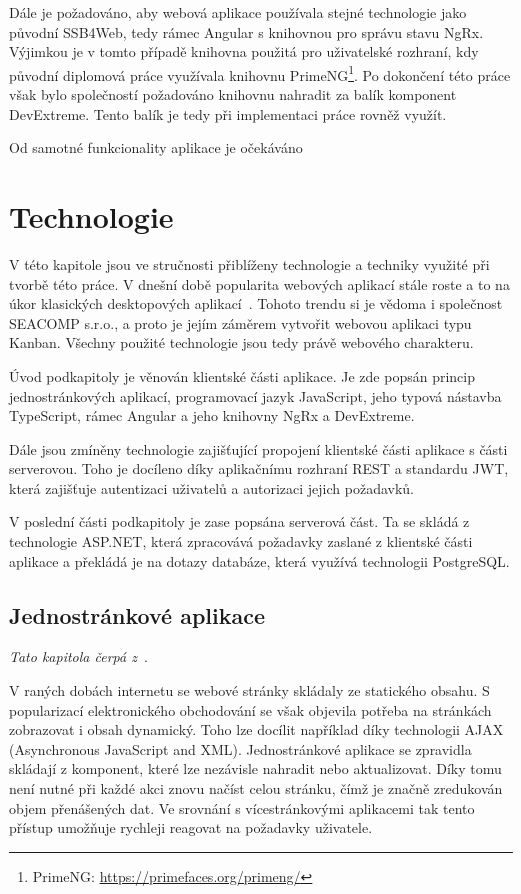 Dále je požadováno, aby webová aplikace používala stejné technologie jako původní SSB4Web, tedy rámec Angular s knihovnou pro správu stavu NgRx. Výjimkou je v tomto případě knihovna použitá pro uživatelské rozhraní, kdy původní diplomová práce využívala knihovnu PrimeNG\footnote{PrimeNG: \url{https://primefaces.org/primeng/}}. Po dokončení této práce však bylo společností požadováno knihovnu nahradit za balík komponent DevExtreme. Tento balík je tedy při implementaci práce rovněž využít.

Od samotné funkcionality aplikace je očekáváno \blindtext




\chapter{Technologie}
V této kapitole jsou ve stručnosti přiblíženy technologie a techniky využité při tvorbě této práce. 
V dnešní době popularita webových aplikací stále roste a to na úkor klasických desktopových aplikací~\cite{bib:web-apps-popular}. Tohoto trendu si je vědoma i společnost SEACOMP s.r.o., a proto je jejím záměrem vytvořit webovou aplikaci typu Kanban. Všechny použité technologie jsou tedy právě webového charakteru.

Úvod podkapitoly je věnován klientské části aplikace. Je zde popsán princip jednostránkových aplikací, programovací jazyk JavaScript, jeho typová nástavba TypeScript, rámec Angular a jeho knihovny NgRx a DevExtreme.

Dále jsou zmíněny technologie zajišťující propojení klientské části aplikace s části serverovou. Toho je docíleno díky aplikačnímu rozhraní REST a standardu JWT, která zajišťuje autentizaci uživatelů a autorizaci jejich požadavků.

V poslední části podkapitoly je zase popsána serverová část. Ta se skládá z technologie ASP.NET, která zpracovává požadavky zaslané z klientské části aplikace a překládá je na dotazy databáze, která využívá technologii PostgreSQL.


\section{Jednostránkové aplikace}\label{sec:spa}

\emph{Tato kapitola čerpá z~\cite{bib:spa}}.

V raných dobách internetu se webové stránky skládaly ze statického obsahu. S popularizací elektronického obchodování se však objevila potřeba na stránkách zobrazovat i obsah dynamický. 
Toho lze docílit například díky technologii AJAX (Asynchronous JavaScript and XML). Jednostránkové aplikace se zpravidla skládají z komponent, které lze nezávisle nahradit nebo aktualizovat. Díky tomu není nutné při každé akci znovu načíst celou stránku, čímž je značně zredukován objem přenášených dat. Ve srovnání s vícestránkovými aplikacemi tak tento přístup umožňuje rychleji reagovat na požadavky uživatele.

